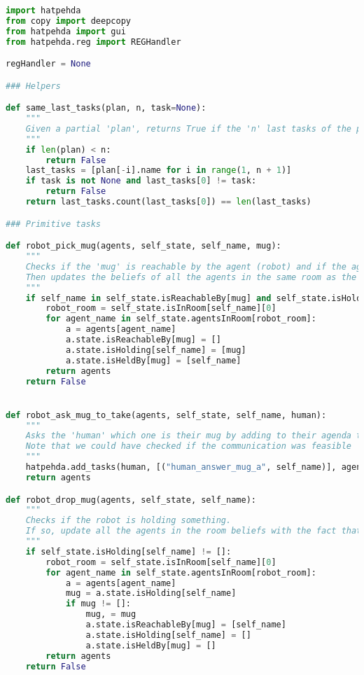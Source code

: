 \begin{lstlisting}[language=Python]
import hatpehda
from copy import deepcopy
from hatpehda import gui
from hatpehda.reg import REGHandler

regHandler = None

### Helpers

def same_last_tasks(plan, n, task=None):
    """
    Given a partial 'plan', returns True if the 'n' last tasks of the partial plan are the same (and optionnaly equal to 'task')
    """
    if len(plan) < n:
        return False
    last_tasks = [plan[-i].name for i in range(1, n + 1)]
    if task is not None and last_tasks[0] != task:
        return False
    return last_tasks.count(last_tasks[0]) == len(last_tasks)

### Primitive tasks

def robot_pick_mug(agents, self_state, self_name, mug):
    """
    Checks if the 'mug' is reachable by the agent (robot) and if the agent does not carry anything.
    Then updates the beliefs of all the agents in the same room as the robot as for the robot having picked the 'mug'
    """
    if self_name in self_state.isReachableBy[mug] and self_state.isHolding[self_name] == []:
        robot_room = self_state.isInRoom[self_name][0]
        for agent_name in self_state.agentsInRoom[robot_room]:
            a = agents[agent_name]
            a.state.isReachableBy[mug] = []
            a.state.isHolding[self_name] = [mug]
            a.state.isHeldBy[mug] = [self_name]
        return agents
    return False


def robot_ask_mug_to_take(agents, self_state, self_name, human):
    """
    Asks the 'human' which one is their mug by adding to their agenda that they will answer the question.
    Note that we could have checked if the communication was feasible
    """
    hatpehda.add_tasks(human, [("human_answer_mug_a", self_name)], agents)
    return agents

def robot_drop_mug(agents, self_state, self_name):
    """
    Checks if the robot is holding something.
    If so, update all the agents in the room beliefs with the fact that the robot as dropped what they thought it was holding.
    """
    if self_state.isHolding[self_name] != []:
        robot_room = self_state.isInRoom[self_name][0]
        for agent_name in self_state.agentsInRoom[robot_room]:
            a = agents[agent_name]
            mug = a.state.isHolding[self_name]
            if mug != []:
                mug, = mug
                a.state.isReachableBy[mug] = [self_name]
                a.state.isHolding[self_name] = []
                a.state.isHeldBy[mug] = []
        return agents
    return False


\end{lstlisting}
